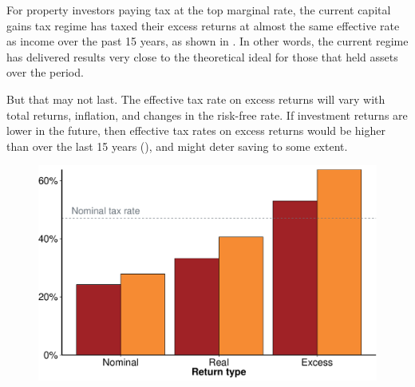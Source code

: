 For property investors paying tax at the top marginal rate, the current capital gains tax regime has taxed their excess returns at almost the same effective rate as income over the past 15 years, as shown in . In other words, the current regime has delivered results very close to the theoretical ideal for those that held assets over the period. 

But that may not last. The effective tax rate on excess returns will vary with total returns, inflation, and changes in the risk-free rate. If investment returns are lower in the future, then effective tax rates on excess returns would be higher than over the last 15 years (), and might deter saving to some extent. 
\begin{figure}[!tp]
\label{fig:EMTR-savings}
\includegraphics[width=\columnwidth]{CGT-NG-atlas//EMTR-nominal-real-excess-historic-vs-lower-1}

\end{figure}
